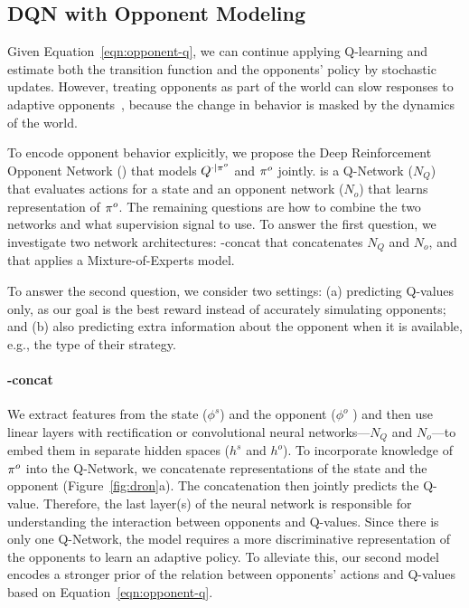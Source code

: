 \subsection{DQN with Opponent Modeling}

Given Equation~\ref{eqn:opponent-q}, we can continue applying Q-learning and
estimate both the transition function and the opponents' policy by stochastic
updates.  However, treating opponents as part of the world can slow
responses to adaptive opponents~\cite{opponent-qlearning}, because
the change in behavior is masked by the dynamics of the world.

To encode opponent behavior explicitly, we propose the Deep
Reinforcement Opponent Network (\dron{}) that models $Q^{\cdot|\pi^o}$
and $\pi^o$ jointly.  \dron{} is a Q-Network ($N_Q$) that
evaluates actions for a state and an opponent network ($N_o$) that
learns representation of $\pi^o$.  The remaining questions are how to
combine the two networks and what supervision signal to use.  To
answer the first question, we investigate two network architectures:
\dron{}-concat that concatenates $N_Q$ and $N_o$, and \dronmoe{} that
applies a Mixture-of-Experts model.



To answer the second question, we consider two settings:
(a) predicting Q-values only, as our goal is the best reward instead of accurately simulating opponents;
and (b) also predicting extra information about the opponent when it is available, e.g., the type of their strategy.

\paragraph{\dron-concat}

We extract features from the state ($\phi^s$) and the opponent ($\phi^o$ ) and
then use linear layers with rectification or convolutional neural networks---$N_Q$ and $N_o$---to embed them
in separate hidden spaces ($h^s$ and $h^o$).
To incorporate knowledge of $\pi^o$ into the Q-Network,
we concatenate representations of the
state and the opponent (Figure~\ref{fig:dron}a).  The
concatenation then jointly predicts the Q-value.  Therefore, the last layer(s) of the neural
network is responsible for understanding the interaction between opponents and
Q-values.  Since there is only one Q-Network, the model requires a more discriminative representation of the opponents to learn an adaptive policy.
To alleviate this, our second model encodes a
stronger prior of the relation between opponents' actions and Q-values based on Equation~\ref{eqn:opponent-q}.

